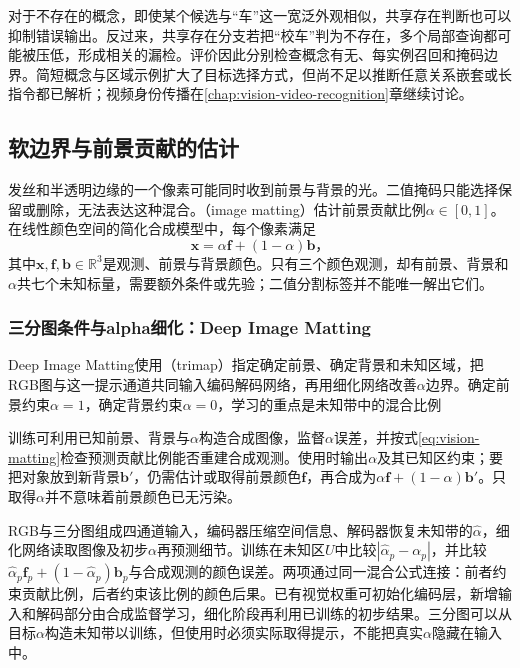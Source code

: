 对于不存在的概念，即使某个候选与“车”这一宽泛外观相似，共享存在判断也可以抑制错误输出。反过来，共享存在分支若把“校车”判为不存在，多个局部查询都可能被压低，形成相关的漏检。评价因此分别检查概念有无、每实例召回和掩码边界。简短概念与区域示例扩大了目标选择方式，但尚不足以推断任意关系嵌套或长指令都已解析；视频身份传播在\ref{chap:vision-video-recognition}章继续讨论。

\subsection{软边界与前景贡献的估计}
\label{sec:vision-recognition-matting}

发丝和半透明边缘的一个像素可能同时收到前景与背景的光。二值掩码只能选择保留或删除，无法表达这种混合。（image matting）估计前景贡献比例$\alpha\in[0,1]$。在线性颜色空间的简化合成模型中，每个像素满足
\begin{equation}
 \bm{x}=\alpha\bm{f}+(1-\alpha)\bm{b}\text{，}
 \label{eq:vision-matting}
\end{equation}
其中$\bm{x},\bm{f},\bm{b}\in\mathbb{R}^3$是观测、前景与背景颜色。只有三个颜色观测，却有前景、背景和$\alpha$共七个未知标量，需要额外条件或先验；二值分割标签并不能唯一解出它们。

\subsubsection{三分图条件与alpha细化：Deep Image Matting}
\label{sec:vision-recognition-deep-matting}

Deep Image Matting使用（trimap）指定确定前景、确定背景和未知区域，把RGB图与这一提示通道共同输入编码解码网络，再用细化网络改善$\alpha$边界。确定前景约束$\alpha=1$，确定背景约束$\alpha=0$，学习的重点是未知带中的混合比例

训练可利用已知前景、背景与$\alpha$构造合成图像，监督$\alpha$误差，并按式\eqref{eq:vision-matting}检查预测贡献比例能否重建合成观测。使用时输出$\alpha$及其已知区约束；要把对象放到新背景$\bm{b}'$，仍需估计或取得前景颜色$\bm{f}$，再合成为$\alpha\bm{f}+(1-\alpha)\bm{b}'$。只取得$\alpha$并不意味着前景颜色已无污染。

RGB与三分图组成四通道输入，编码器压缩空间信息、解码器恢复未知带的$\hat\alpha$，细化网络读取图像及初步$\alpha$再预测细节。训练在未知区$U$中比较$|\hat\alpha_p-\alpha_p|$，并比较$\hat\alpha_p\bm f_p+(1-\hat\alpha_p)\bm b_p$与合成观测的颜色误差。两项通过同一混合公式连接：前者约束贡献比例，后者约束该比例的颜色后果。已有视觉权重可初始化编码层，新增输入和解码部分由合成监督学习，细化阶段再利用已训练的初步结果。三分图可以从目标$\alpha$构造未知带以训练，但使用时必须实际取得提示，不能把真实$\alpha$隐藏在输入中。

